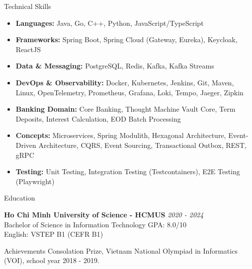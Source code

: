\documentclass{resume} %
\begin{document}
\begin{rSection}{Technical Skills}
    \begin{itemize}[label={}, leftmargin=1.5em, itemindent=-1.5em, itemsep=0pt, topsep=0pt] %
        \item {\bf Languages:} Java, Go, C++, Python, JavaScript/TypeScript
        \item {\bf Frameworks:} Spring Boot, Spring Cloud (Gateway, Eureka), Keycloak, ReactJS
        \item {\bf Data \& Messaging:} PostgreSQL, Redis, Kafka, Kafka Streams
        \item {\bf DevOps \& Observability:} Docker, Kubernetes, Jenkins, Git, Maven, Linux, OpenTelemetry, Prometheus, Grafana, Loki, Tempo, Jaeger, Zipkin
        \item {\bf Banking Domain:} Core Banking, Thought Machine Vault Core, Term Deposits, Interest Calculation, EOD Batch Processing
        \item {\bf Concepts:} Microservices, Spring Modulith, Hexagonal Architecture, Event-Driven Architecture, CQRS, Event Sourcing, Transactional Outbox, REST, gRPC
        \item {\bf Testing:} Unit Testing, Integration Testing (Testcontainers), E2E Testing (Playwright)
    \end{itemize}
\end{rSection}


\begin{rSection}{Education}

    {\bf Ho Chi Minh University of Science - HCMUS} \hfill {\em 2020 - 2024}
    \\ Bachelor of Science in Information Technology \hfill GPA: 8.0/10
    \\ English: VSTEP B1 (CEFR B1)

\end{rSection}

\begin{rSection}{Achievements}
    Consolation Prize, Vietnam National Olympiad in Informatics (VOI), school year 2018 - 2019.
\end{rSection}
\end{document}
